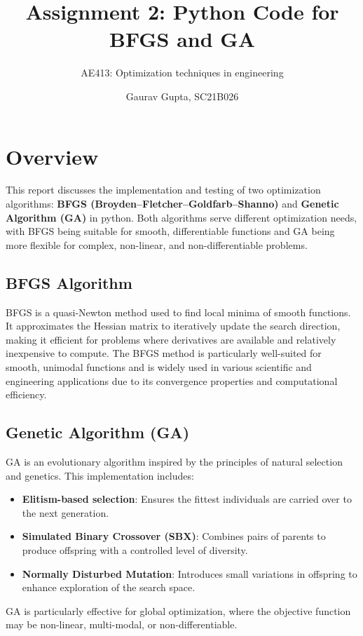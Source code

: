 \documentclass[12pt,a4paper,oneside]{paper} %
\title{Assignment 2: Python Code for BFGS and GA}
\subtitle{AE413: Optimization techniques in engineering}
\author{Gaurav Gupta, SC21B026}
\begin{document}
\maketitle


\section{Overview}

This report discusses the implementation and testing of two optimization algorithms: \textbf{BFGS (Broyden–Fletcher–Goldfarb–Shanno)} and \textbf{Genetic Algorithm (GA)} in python. Both algorithms serve different optimization needs, with BFGS being suitable for smooth, differentiable functions and GA being more flexible for complex, non-linear, and non-differentiable problems.

\subsection*{BFGS Algorithm}

BFGS is a quasi-Newton method used to find local minima of smooth functions. It approximates the Hessian matrix to iteratively update the search direction, making it efficient for problems where derivatives are available and relatively inexpensive to compute. The BFGS method is particularly well-suited for smooth, unimodal functions and is widely used in various scientific and engineering applications due to its convergence properties and computational efficiency.

\subsection*{Genetic Algorithm (GA)}

GA is an evolutionary algorithm inspired by the principles of natural selection and genetics. This implementation includes:
\begin{itemize}
    \item \textbf{Elitism-based selection}: Ensures the fittest individuals are carried over to the next generation.
    \item \textbf{Simulated Binary Crossover (SBX)}: Combines pairs of parents to produce offspring with a controlled level of diversity.
    \item \textbf{Normally Disturbed Mutation}: Introduces small variations in offspring to enhance exploration of the search space.
\end{itemize}
GA is particularly effective for global optimization, where the objective function may be non-linear, multi-modal, or non-differentiable.
\end{document}
